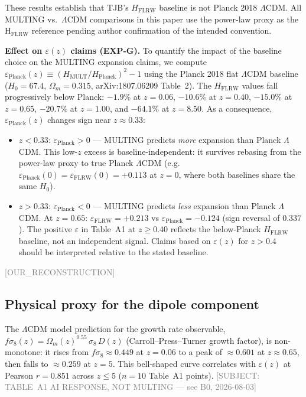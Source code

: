 \documentclass[twocolumn,prd,amsmath,amssymb,floatfix]{revtex4-2}
\newcommand{\reconstruction}{\textcolor{gray}{\small[OUR\_RECONSTRUCTION]}}
\newcommand{\tableAsubject}{\textcolor{gray}{\small[SUBJECT:
  TABLE~A1 AI RESPONSE, NOT MULTING --- see B0, 2026-08-03]}}
\begin{document}
These results establish that TJB's $H_\mathrm{FLRW}$ baseline is not
Planck 2018 $\Lambda$CDM.  All MULTING vs.\ $\Lambda$CDM comparisons
in this paper use the power-law proxy as the H$_\mathrm{FLRW}$ reference
pending author confirmation of the intended convention.

\textbf{Effect on $\varepsilon(z)$ claims (EXP-G).}
To quantify the impact of the baseline choice on the MULTING expansion claims,
we compute $\varepsilon_\mathrm{Planck}(z) \equiv (H_\mathrm{MULT}/H_\mathrm{Planck})^2 - 1$
using the Planck 2018 flat $\Lambda$CDM baseline ($H_0 = 67.4$, $\Omega_m = 0.315$,
arXiv:1807.06209 Table~2).
The $H_\mathrm{FLRW}$ values fall progressively below Planck: $-1.9\%$ at $z=0.06$,
$-10.6\%$ at $z=0.40$, $-15.0\%$ at $z=0.65$, $-20.7\%$ at $z=1.00$,
and $-64.1\%$ at $z=8.50$.
As a consequence, $\varepsilon_\mathrm{Planck}(z)$ changes sign near $z \approx 0.33$:
\begin{itemize}
  \item $z < 0.33$: $\varepsilon_\mathrm{Planck} > 0$ --- MULTING predicts \emph{more}
        expansion than Planck $\Lambda$CDM.  This low-$z$ excess is
        baseline-independent: it survives rebasing from the power-law proxy
        to true Planck $\Lambda$CDM (e.g.\ $\varepsilon_\mathrm{Planck}(0) =
        \varepsilon_\mathrm{FLRW}(0) = +0.113$ at $z=0$, where both baselines
        share the same $H_0$).
  \item $z > 0.33$: $\varepsilon_\mathrm{Planck} < 0$ --- MULTING predicts
        \emph{less} expansion than Planck $\Lambda$CDM.
        At $z = 0.65$: $\varepsilon_\mathrm{FLRW} = +0.213$ vs
        $\varepsilon_\mathrm{Planck} = -0.124$ (sign reversal of $0.337$).
        The positive $\varepsilon$ in Table~A1 at $z \ge 0.40$ reflects
        the below-Planck $H_\mathrm{FLRW}$ baseline, not an independent signal.
        Claims based on $\varepsilon(z)$ for $z > 0.4$ should be interpreted
        relative to the stated baseline.
\end{itemize}
\reconstruction

\subsection{Physical proxy for the dipole component}
\label{ssec:fsig8}

The $\Lambda$CDM model prediction for the growth rate observable,
$f\sigma_8(z) = \Omega_m(z)^{0.55}\,\sigma_8\,D(z)$
(Carroll--Press--Turner growth factor), is non-monotone: it rises from
$f\sigma_8 \approx 0.449$ at $z=0.06$ to a peak of $\approx 0.601$ at $z \approx 0.65$,
then falls to $\approx 0.259$ at $z=5$.
This bell-shaped curve correlates with $\varepsilon(z)$ at Pearson
$r = 0.851$ across $z \le 5$ ($n=10$ Table~A1 points).
\tableAsubject
\end{document}
